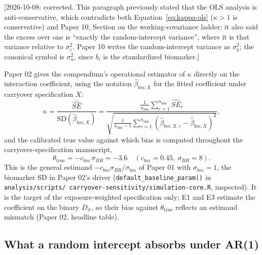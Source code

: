 \documentclass[11pt]{article}
\newcommand{\note}[1]{\textcolor{blue!60!black}{\small [#1]}}
\newcommand{\code}[1]{\texttt{#1}}
\begin{document}
\note{2026-10-08: corrected. This paragraph previously stated that the
OLS analysis is anti-conservative, which contradicts both
Equation~\eqref{eq:kappa-ols} ($\kappa > 1$ is conservative) and Paper
10, Section on the working-covariance ladder; it also said the excess
over one is ``exactly the random-intercept variance'', where it is
that variance relative to $\sigma_\varepsilon^2$. Paper 10 writes the
random-intercept variance as $\sigma_b^2$; the canonical symbol is
$\sigma_u^2$, since $b_i$ is the standardized biomarker.}

Paper 02 gives the compendium's operational estimator of $\kappa$
directly on the interaction coefficient, using the notation
$\hat\beta_{bm:X}$ for the fitted coefficient under carryover
specification $X$:
\begin{equation}
\kappa = \frac{\overline{\widehat{SE}}}{\mathrm{SD}(\hat\beta_{bm:X})}
  = \frac{\frac{1}{n_{\mathrm{sim}}}\sum_{r=1}^{n_{\mathrm{sim}}}
  \widehat{SE}_r}{\sqrt{\frac{1}{n_{\mathrm{sim}}-1}
  \sum_{r=1}^{n_{\mathrm{sim}}} (\hat\beta_{bm:X,r} -
  \bar{\hat\beta}_{bm:X})^2}},
\label{eq:kappa-estimator}
\end{equation}
and the calibrated true value against which bias is computed
throughout the carryover-specification manuscript,
\begin{equation}
\theta_{\mathrm{true}} = -c_{bm}\,\sigma_{BR} = -3.6
  \quad (c_{bm} = 0.45,\ \sigma_{BR} = 8).
\label{eq:theta-true}
\end{equation}
This is the general estimand $-c_{bm}\sigma_{BR}/\sigma_{bm}$ of Paper
01 with $\sigma_{bm} = 1$, the biomarker SD in Paper 02's driver
(\code{default\_baseline\_param()} in
\code{analysis/\allowbreak scripts/\allowbreak
carryover-sensitivity/\allowbreak simulation-core.R},
inspected). It is the target of the exposure-weighted specification
only; E1 and E3 estimate the coefficient on the binary $D_{it}$, so
their bias against $\theta_{\mathrm{true}}$ reflects an estimand
mismatch (Paper 02, headline table).

\subsection{What a random intercept absorbs under AR(1)}
\label{sec:inva-ri}
\end{document}
